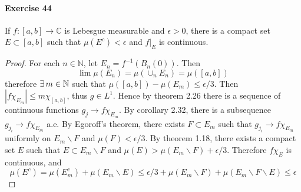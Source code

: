 \paragraph{Exercise 44}
If $f:[a,b]\to\mathbb{C}$ is Lebesgue measurable and $\epsilon>0$, there is a compact set $E\subset[a,b]$ such that $\mu(E^c)<\epsilon$ and $f|_E$ is continuous.
\begin{proof}
    For each $n\in\mathbb{N}$, let $E_n=f^{-1}(B_n(0))$. Then
    $$
    \lim\mu(E_n)=\mu(\cup_nE_n)=\mu([a,b])
    $$
    therefore $\exists\, m\in\mathbb{N}$ such that $\mu([a,b])-\mu(E_m)\le\epsilon/3$. Then $|f\chi_{E_m}|\le m\chi_{[a,b]}$, thus $g\in L^1$. Hence by theorem 2.26 there is a sequence of continuous functions $g_j\to f\chi_{E_m}$. By corollary 2.32, there is a subsequence $g_{j_i}\to f\chi_{E_m}$ a.e. By Egoroff's theorem, there exists $F\subset E_m$ such that $g_{j_i}\to f\chi_{E_m}$ uniformly on $E_m\backslash F$ and $\mu(F)<\epsilon/3$. By theorem 1.18, there exists a compact set $E$ such that $E\subset E_m\backslash F$ and $\mu(E)>\mu(E_m\backslash F)+\epsilon/3$. Therefore $f\chi_E$ is continuous, and 
    $$
    \mu(E^c)=\mu(E_m^c)+\mu(E_m\backslash E)\le\epsilon/3+\mu(E_m\backslash F)+\mu(E_m\backslash F\backslash E)\le\epsilon
    $$
\end{proof}